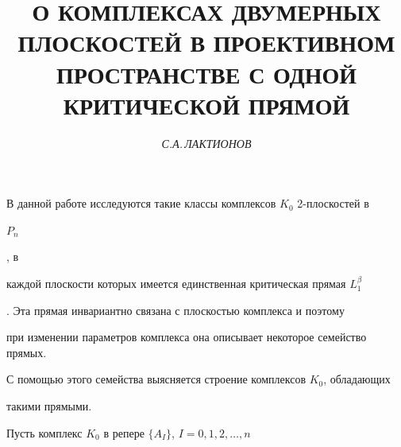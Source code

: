 

 


\renewcommand{\baselinestretch}{1.10}


\setcounter{page}{78} 








\author{\it С.А.\,ЛАКТИОНОВ} 


\title{О КОМПЛЕКСАХ ДВУМЕРНЫХ ПЛОСКОСТЕЙ В ПРОЕКТИВНОМ\\


ПРОСТРАНСТВЕ С ОДНОЙ КРИТИЧЕСКОЙ ПРЯМОЙ} 


 


\date{} 


\pagestyle{plain} 


 


 


\maketitle 


 


В данной работе исследуются такие классы комплексов $K_0$ 2-плоскостей в 


$P_n$ 


\cite{La1}, в 


каждой плоскости которых имеется единственная критическая прямая $L_1^\beta$ 


\cite{Kru}. Эта прямая инвариантно связана с плоскостью комплекса и поэтому 


при изменении параметров комплекса она описывает некоторое семейство прямых. 


С помощью этого семейства выясняется строение комплексов $K_0$, обладающих 


такими прямыми. 


 


Пусть комплекс $K_0$ в репере $\{A_I\}$, $I=0,1,2,\dotsc,n$


